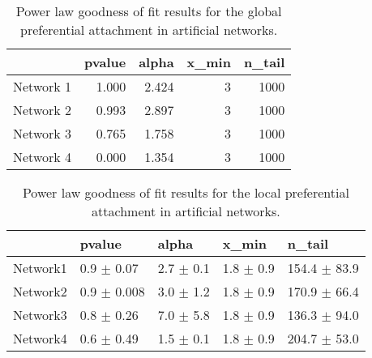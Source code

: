\documentclass[a4paper, 12pt]{article}
\begin{document}
\begin{table}[h]
\caption{Power law goodness of fit results for the global preferential attachment in artificial networks.}
\centering
  \begin{tabular}{lrrrr}
  	\hline
  	&   pvalue &   alpha &   x\_min &   n\_tail \\
  	\hline
  	Network 1 &    1.000 &   2.424 &       3 &     1000 \\
  	Network 2 &    0.993 &   2.897 &       3 &     1000 \\
  	Network 3 &    0.765 &   1.758 &       3 &     1000 \\
  	Network 4 &    0.000 &   1.354 &       3 &     1000 \\
  	\hline
  \end{tabular}
\label{table:synt_graph}
\end{table}

\begin{table}[h]
\caption{Power law goodness of fit results for the local preferential attachment in artificial networks.}
\centering
    \begin{tabular}{lllll}
    \hline
    & pvalue          & alpha           & x\_min        & n\_tail           \\
    \hline
    Network1 & 0.9 $\pm$ 0.07  & 2.7 $\pm$ 0.1 & 1.8 $\pm$ 0.9 & 154.4 $\pm$ 83.9 \\
    Network2 & 0.9 $\pm$ 0.008 & 3.0 $\pm$ 1.2  & 1.8 $\pm$ 0.9 & 170.9 $\pm$ 66.4  \\
    Network3 & 0.8 $\pm$ 0.26 & 7.0 $\pm$ 5.8 & 1.8 $\pm$ 0.9 & 136.3 $\pm$ 94.0 \\
    Network4 & 0.6 $\pm$ 0.49    & 1.5 $\pm$ 0.1 & 1.8 $\pm$ 0.9 & 204.7 $\pm$ 53.0 \\
    \hline
    \end{tabular}




\label{table:synt_graph_local}
\end{table}
\end{document}
